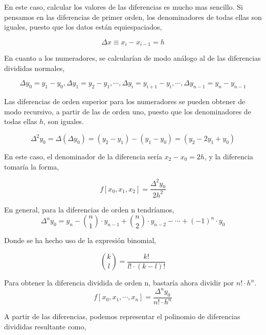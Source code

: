 En este caso, calcular los valores de las diferencias es mucho mas sencillo.  Si pensamos en las diferencias de primer orden, los denominadores de todas ellas son iguales, puesto que los datos están equiespaciados,

\begin{equation*}
\Delta x \equiv x_i-x_{i-1} =h
\end{equation*}

En cuanto a los numeradores, se calcularían de modo análogo al de las diferencias divididas normales,

\begin{equation*}
\Delta y_0= y_1-y_0, \Delta y_1=y_2-y_1, \cdots, \Delta y_i=y_{i+1}-y_i, \cdots, \Delta y_{n-1}=y_{n}-y_{n-1}
\end{equation*}

Las diferencias de orden superior para los numeradores se pueden obtener de modo recursivo, a partir de las de orden uno, puesto que los denominadores de todas ellas $h$, son iguales.


\begin{equation*}
\Delta^2 y_0=\Delta \left(\Delta y_0 \right) =(y_2-y_1)-(y_1-y_0)=(y_2-2y_1+y_0)
\end{equation*}

En este caso, el denominador de la diferencia sería $x_2-x_0=2h$, y la diferencia tomaría la forma,

\begin{equation*}
f[x_0,x_1,x_2]=\frac{\Delta^2y_0}{2h^2}
\end{equation*}

En general, para la diferencias de orden n tendríamos,
\begin{equation*}
\Delta^n y_0=y_n-\binom{n}{1}\cdot y_{n-1}+\binom{n}{2}\cdot y_{n-2}-\cdots+(-1)^n\cdot y_0
\end{equation*}

Donde se ha hecho uso de la expresión binomial,

\begin{equation*}
\binom{k}{l}=\frac{k!}{l!\cdot(k-l)!}
\end{equation*}

Para obtener la diferencia dividida de orden n, bastaría ahora dividir por $n!\cdot h^n$.
\begin{equation*}
f\left[x_0,x_1,\cdots,x_n\right]=\frac{\Delta^n y_0}{n!\cdot h^n}
\end{equation*}

A partir de las diferencias, podemos representar el polinomio de diferencias divididas resultante como,


